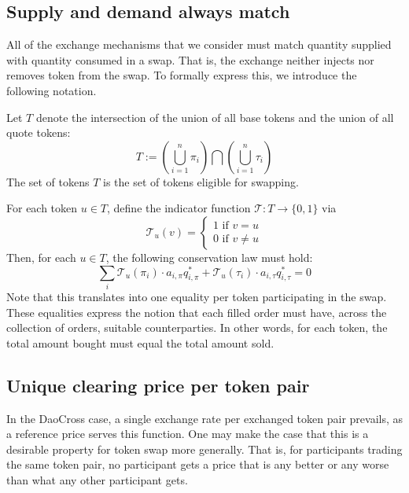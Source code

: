 \documentclass[11pt, reqno]{amsart}
\theoremstyle{definition}
\theoremstyle{remark}
\begin{document}
\subsection{Supply and demand always match}
All of the exchange mechanisms that we consider must match quantity supplied
with quantity consumed in a swap. That is, the exchange neither injects nor
removes token from the swap. To formally express this, we introduce the
following notation.

Let $T$ denote the intersection of the union of all base tokens and the union
of all quote tokens:
\[
	T :=
    \left( \bigcup_{i=1}^n \pi_i \right)
	\bigcap
    \left( \bigcup_{i=1}^n \tau_i \right)
\]
The set of tokens $T$ is the set of tokens eligible for swapping.

For each token $u \in T$, define the indicator function
$\mathcal{T}: T \to \{0, 1\}$ via
\[
	\mathcal{T}_u(v) =
	\begin{cases}
		1 \text{ if } v = u \\
		0 \text{ if } v \neq u
	\end{cases}
\]
Then, for each $u \in T$, the following conservation law must hold:
\begin{equation}\label{token_conservation_law}
    \sum_i \mathcal{T}_u(\pi_i) \cdot a_{i, \pi} q_{i, \pi}^*
    + \mathcal{T}_u(\tau_i) \cdot a_{i, \tau} q_{i, \tau}^*
    = 0
\end{equation}
Note that this translates into one equality per token participating in the
swap. These equalities express the notion that each filled order must have,
across the collection of orders, suitable counterparties. In other words,
for each token, the total amount bought must equal the total amount sold.

\subsection{Unique clearing price per token pair}

In the DaoCross case, a single exchange rate per exchanged token pair
prevails, as a reference price serves this function.
One may make the case that this is a desirable property for token swap more
generally. That is, for participants trading the same token pair, no
participant gets a price that is any better or any worse than what any other
participant gets.
\end{document}
